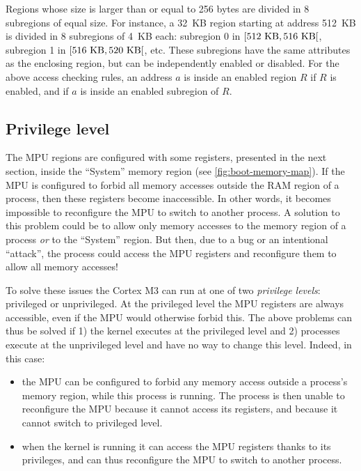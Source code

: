Regions whose size is larger than or equal to 256 bytes are divided in 8
subregions of equal size. For instance, a 32~KB region starting at address
512~KB is divided in 8 subregions of 4~KB each: subregion 0 in
$[512~\rm{KB},516~\rm{KB}[$, subregion 1 in $[516~\rm{KB},520~\rm{KB}[$, etc.
These subregions have the same attributes as the enclosing region, but can be
independently enabled or disabled. For the above access checking rules, an
address $a$ is inside an enabled region $R$ if $R$ is enabled, and if $a$ is
inside an enabled subregion of $R$.

\subsection{Privilege level}

The MPU regions are configured with some registers, presented in the next
section, inside the ``System'' memory region (see \cref{fig:boot-memory-map}).
If the MPU is configured to forbid all memory accesses outside the RAM region
of a process, then these registers become inaccessible. In other words, it
becomes impossible to reconfigure the MPU to switch to another process. A
solution to this problem could be to allow only memory accesses to the memory
region of a process {\em or} to the ``System'' region. But then, due to a bug
or an intentional ``attack'', the process could access the MPU registers and
reconfigure them to allow all memory accesses!

To solve these issues the Cortex M3 can run at one of two {\em privilege
levels}: privileged or unprivileged. At the privileged level the MPU registers
are always accessible, even if the MPU would otherwise forbid this. The above
problems can thus be solved if 1) the kernel executes at the privileged level
and 2) processes execute at the unprivileged level and have no way to change
this level. Indeed, in this case:
\begin{itemize}
  \item the MPU can be configured to forbid any memory access outside a
  process's memory region, while this process is running. The process is then
  unable to reconfigure the MPU because it cannot access its registers, and
  because it cannot switch to privileged level.

  \item when the kernel is running it can access the MPU registers thanks to
  its privileges, and can thus reconfigure the MPU to switch to another process.
\end{itemize}

